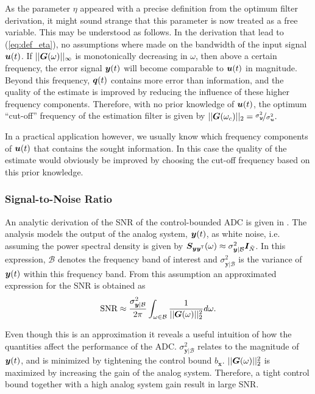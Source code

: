 As the parameter $\eta$ appeared with a precise definition from the optimum filter derivation, it might sound strange that this parameter is now treated as a free variable. This may be understood as follows. In the derivation that lead to (\ref{eq:def_eta}), no assumptions where made on the bandwidth of the input signal $\bm{u}(t)$. If $||\bm{G}(\omega)||_{\infty}$ is monotonically decreasing in $\omega$, then above a certain frequency, the error signal $\bm{y}(t)$ will become comparable to $\bm{u}(t)$ in magnitude. Beyond this frequency, $\bm{q}(t)$ contains more error than information, and the quality of the estimate is improved by reducing the influence of these higher frequency components. Therefore, with no prior knowledge of $\bm{u}(t)$, the optimum \enquote{cut-off} frequency of the estimation filter is given by $||\bm{G}(\omega_c)||_2 =\nicefrac{\sigma_{\bm{y}}^2}{\sigma_{\bm{u}}^2}.$

In a practical application however, we usually know which frequency components of $\bm{u}(t)$ that contains the sought information. In this case the quality of the estimate would obviously be improved by choosing the cut-off frequency based on this prior knowledge.



\subsubsection*{Signal-to-Noise Ratio}
An analytic derivation of the SNR of the control-bounded ADC is given in \cite{cbc_2020_loeliger}. The analysis models the output of the analog system, $\bm{y}(t)$, as white noise, i.e. assuming the power spectral density is given by $\bm{S}_{\bm{y}\bm{y}^\mathsf{T}}(\omega) \approx \sigma_{\bm{y}|\mathcal{B}}^2\bm{I}_{\tilde{N}}$. In this expression, $\mathcal{B}$ denotes the frequency band of interest and $\sigma_{\bm{y}|\mathcal{B}}^2$ is the variance of $\bm{y}(t)$ within this frequency band. From this assumption an approximated expression for the SNR is obtained as
\begin{equation}
    \label{eq:analytic_snr_est}
    \text{SNR} \approx \frac{\sigma_{\bm{y}|\mathcal{B}}^2}{2 \pi} \int_{\omega \in \mathcal{B}} \frac{1}{||\bm{G}(\omega)||_{2}^2} d\omega.
\end{equation}

Even though this is an approximation it reveals a useful intuition of how the quantities affect the performance of the ADC. $\sigma_{\bm{y}|\mathcal{B}}^2$ relates to the magnitude of $\bm{y}(t)$, and is minimized by tightening the control bound $b_{\bm{x}}$. $||\bm{G}(\omega)||_{2}^2$ is maximized by increasing the gain of the analog system. Therefore, a tight control bound together with a high analog system gain result in large SNR.

